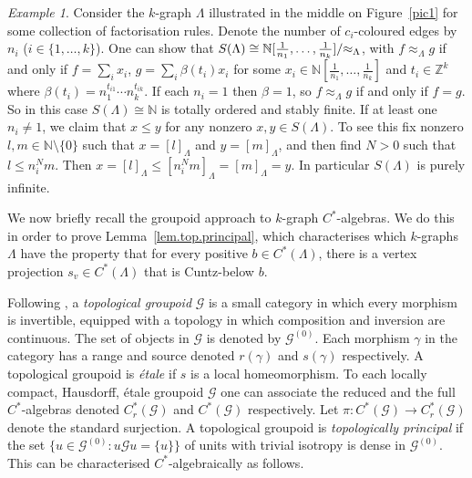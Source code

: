 \documentclass[a4paper, 12pt]{amsart}
\numberwithin{equation}{section}
\newcounter{theorem}
\theoremstyle{remark}
\newtheorem{example}[theorem]{Example}
\theoremstyle{definition}
\begin{document}
\begin{example}
\label{three.colour} Consider the $k$-graph $\Lambda$ illustrated in the middle on
Figure~\ref{pic1} for some collection of factorisation rules. Denote the number of
$c_i$-coloured edges by $n_i$ ($i\in\{1,\dots, k\}$). One can show that $S(\Lambda)\cong
{\mathbb{N}}[\frac{1}{n_1},\dots, \frac{1}{n_k}]/{\negthickspace}\approx_{\Lambda}$, with $f
\approx_{\Lambda} g$ if and only if $f=\sum_i x_i$,  $g=\sum_i \beta(t_i) x_i$ for some
$x_i\in {\mathbb{N}}[\frac{1}{n_1},\dots, \frac{1}{n_k}]$ and $t_i\in {\mathbb{Z}}^{k}$ where
$\beta(t_i)=n_1^{t_{i1}}\cdots n_k^{t_{ik}}$. If each $n_i=1$ then $\beta=1$, so $f
\approx_{\Lambda} g$ if and only if $f=g$. So in this case $S(\Lambda)\cong{\mathbb{N}}$ is totally
ordered and stably finite. If at least one $n_i\neq 1$, we claim that $x\leq y$ for any
nonzero $x,y\in S(\Lambda)$. To see this fix nonzero $l,m\in {\mathbb{N}}\setminus \{0\}$ such
that $x={{[{l}]_\Lambda}}$ and $y={{[{m}]_\Lambda}}$, and then find $N>0$ such that $l\leq n_i^N m$. Then
$x={{[{l}]_\Lambda}}\leq {{[{n_i^N m}]_\Lambda}}={{[{m}]_\Lambda}}=y$. In particular $S(\Lambda)$ is purely
infinite.
\end{example}

We now briefly recall the groupoid approach to $k$-graph $C^*$-algebras. We do this in
order to prove Lemma~\ref{lem.top.principal}, which characterises which $k$-graphs
$\Lambda$ have the property that for every positive $b \in C^*(\Lambda)$, there is a
vertex projection $s_v \in C^*(\Lambda)$ that is Cuntz-below $b$.

Following \cite{BroClaSie}, a \emph{topological groupoid} ${\mathcal{G}}$ is a small category in
which every morphism is invertible, equipped with a topology in which composition and
inversion are continuous. The set of objects in ${\mathcal{G}}$ is denoted by ${\mathcal{G}}^{(0)}$. Each
morphism $\gamma$ in the category has a range and source denoted $r(\gamma)$ and
$s(\gamma)$ respectively. A topological groupoid is \emph{\'etale} if $s$ is a local
homeomorphism. To each locally compact, Hausdorff, \'etale groupoid ${\mathcal{G}}$ one can
associate the reduced and the full $C^*$-algebras denoted $C^*_r({\mathcal{G}})$ and $C^*({\mathcal{G}})$
respectively. Let $\pi\colon  C^*({\mathcal{G}})\to  C^*_r({\mathcal{G}})$ denote the standard surjection. A
topological groupoid is \emph{topologically principal} if the set $\{u\in {\mathcal{G}}^{(0)} :u{\mathcal{G}}
u =\{u\}\}$ of units with trivial isotropy is dense in ${\mathcal{G}}^{(0)}$. This can be
characterised $C^*$-algebraically as follows.
\end{document}
